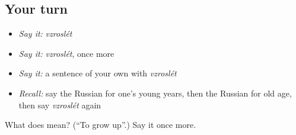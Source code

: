 \subsection*{Your turn}
\begin{itemize}
\raggedright
  \item \emph{Say it:} \emph{vzroslét}
  \item \emph{Say it:} \emph{vzroslét}, once more
  \item \emph{Say it:} a sentence of your own with \emph{vzroslét}
  \item \emph{Recall:} say the Russian for one's young years, then the Russian for old age, then say \emph{vzroslét} again
\end{itemize}

\begin{tcolorbox}[breakable,colback=teal!4,colframe=teal!35!black,title={Before you move on}]
What does  mean? (\textquotedblleft{}To grow up\textquotedblright{}.) Say it once more.
\end{tcolorbox}
